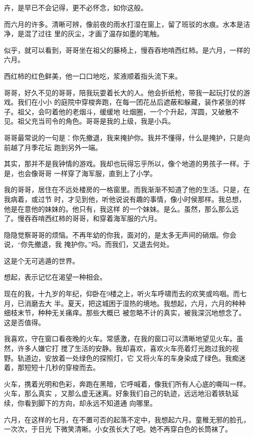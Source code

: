 \documentclass[12pt,a4paper]{article}
\def\blankrev{\vspace{1ex}}									%
\begin{document}
		卉，是早已不会记得，更不必怀念，如你这般。

		而六月的许多。清晰可辨，像前夜的雨水打湿在窗上，留了班驳的水痕。水本是洁净，是混了过往
	里的灰尘，才画了温存如墨的笔触。

		\blankrev

		似乎，就可以看到，哥哥坐在祖父的藤椅上，慢吞吞地啃西红柿。是六月，一样的六月。

		西红柿的红色鲜美，他一口口地吃，浆液顺着指头流下来。

		哥哥，好久不见的哥哥，陪我玩耍着长大的人。他会折纸枪，带我一起玩打仗的游戏。我们在小小
	的庭院中穿梭奔跑，在每一团花丛后遮蔽和躲藏，装作紧张的样子。祖父，会叼着他的老烟斗，缓缓地
	吐烟圈，一个个升起，浑圆，又破散不见。祖父充当司令的角色。哥哥是我的上级，我是小兵。

		哥哥最常说的一句是：你先撤退，我来掩护你。我并不懂得，什么是掩护，只是向前越了月季花坛
	跑到另外一端。

		其实，那并不是我钟情的游戏。我却也玩得忘乎所以，像个地道的男孩子一样。于是，也会像哥哥
	一样穿了海军服，直到上了小学。

		我的哥哥，居住在不远处楼房的一格窗里。而我渐渐不知道了他的生活。只是，在我病着，或过节
	时，才见到他，听他说说有趣的事情，像小时侯那样。我总想，他是在意他的妹妹的。他只有，我这样
	的一个妹妹。是么。虽然，那么那么远了。慢吞吞啃西红柿的哥哥，和穿着海军服的六月。

		隐隐觉察哥哥的烦恼。不再年幼的你我，面对的，是太多无声间的硝烟。你会说，“你先撤退，我
	掩护你。”吗。而我们，又退去何处。

		\blankrev

		这是个无可逃遁的世界。\par
		想起，表示记忆在渴望一种相会。

		现在的我，十九岁的年纪，仰卧在9楼之上，听火车呼啸而去的欢笑或呜咽。而七月，已消磨去大
	半。夏天，把这城困于湿热的境地。我想起，六月，六月的种种细枝末节，种种无关痛痒。那些大概已
	被忽略不计的真实，被我深沉地想念了。这是否值得。

		我喜欢，守在窗口看夜晚的火车。常感激，在我的窗口可以清晰地望见火车。虽然，许多人嫌它打
	搅了生活的安静。我却喜欢，喜欢火车亮着灯光跑过我的视野。轨道边，安放着一处绿色的探照灯，它
	又将火车的车身染成了绿色。我痴迷着，那短短十几秒的穿梭而去。

		火车，携着光明和色彩，奔跑在黑暗，它呼喊着，像我们所有人心底的嘶叫一样。火车，那么真实
	，又那么虚无迷离。好象我们自己的轨迹，远远地沿着铁轨延续，你看到脚下的方向，却永远不知道通
	向哪里。

		六月，在这样的七月，在不置可否的起落不定中，我想起六月。童稚无邪的脸孔，一次次，于日光
	下微笑清晰。小女孩长大了吧。她不再穿白色的长筒袜了。
\end{document}
